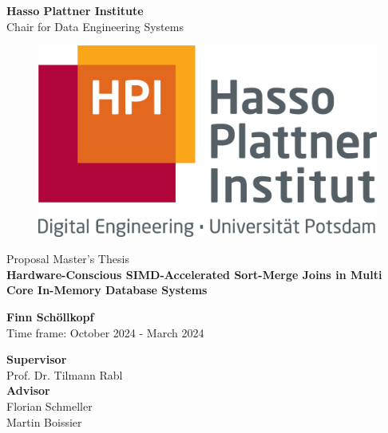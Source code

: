 \documentclass[a4paper, titlepage, 12pt]{article}
\newcommand{\thesisTitle}{Hardware-Conscious SIMD-Accelerated Sort-Merge Joins in Multi Core In-Memory Database Systems}
\newcommand{\name}{Finn Schöllkopf}
\newcommand{\timeFrame}{October 2024 - March 2024}
\newcommand{\supervisor}{Prof. Dr. Tilmann Rabl}
\newcommand{\advisor}{Florian Schmeller \\ Martin Boissier}
\newcommand{\thesisType}{Master's}
\begin{document}
\begin{titlepage}
\begin{center}
\LARGE{\textbf{Hasso Plattner Institute}}\\
\normalsize{Chair for Data Engineering Systems}\\[0.3cm]

\begin{figure}[h!]
    \centering
    \includegraphics[width=.3\linewidth]{images/hpi_logo.jpg}
\end{figure}
\vspace{1cm}

\LARGE{Proposal {\thesisType} Thesis}\\[0.7cm]
\LARGE{\textbf{\thesisTitle}}

\vspace{1cm} 

\Large{\textbf{\name}} \\[3pt]  
\vspace{0.5cm}
\large{Time frame: \timeFrame} \\ 

\vspace{1cm}

\large{\textbf{Supervisor}}\\
\supervisor\\
\vspace{0.5cm}
\textbf{Advisor}\\
\advisor\\
\end{center}
\end{titlepage}







\clearpage

{\small 

}
\end{document}

